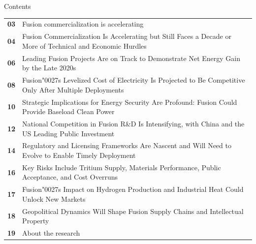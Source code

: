 \documentclass[10pt,a4paper]{article}
\newcommand{\BOApos}{{\BOQuoteFont\char"0027}}
\begin{document}
\clearpage
{\sffamily\fontsize{26}{31}\selectfont\color{BONavy} Contents}\par\vspace{10pt}
\begin{tabularx}{\linewidth}{p{14mm}Y}
\textcolor{BOGreen}{\bfseries 03} & Fusion commercialization is accelerating \\[5pt]
\textcolor{BOGreen}{\bfseries 04} & Fusion Commercialization Is Accelerating but Still Faces a Decade or More of Technical and Economic Hurdles \\[5pt]
\textcolor{BOGreen}{\bfseries 06} & Leading Fusion Projects Are on Track to Demonstrate Net Energy Gain by the Late 2020s \\[5pt]
\textcolor{BOGreen}{\bfseries 08} & Fusion\BOApos{}s Levelized Cost of Electricity Is Projected to Be Competitive Only After Multiple Deployments \\[5pt]
\textcolor{BOGreen}{\bfseries 10} & Strategic Implications for Energy Security Are Profound: Fusion Could Provide Baseload Clean Power \\[5pt]
\textcolor{BOGreen}{\bfseries 12} & National Competition in Fusion R\&D Is Intensifying, with China and the US Leading Public Investment \\[5pt]
\textcolor{BOGreen}{\bfseries 14} & Regulatory and Licensing Frameworks Are Nascent and Will Need to Evolve to Enable Timely Deployment \\[5pt]
\textcolor{BOGreen}{\bfseries 16} & Key Risks Include Tritium Supply, Materials Performance, Public Acceptance, and Cost Overruns \\[5pt]
\textcolor{BOGreen}{\bfseries 17} & Fusion\BOApos{}s Impact on Hydrogen Production and Industrial Heat Could Unlock New Markets \\[5pt]
\textcolor{BOGreen}{\bfseries 18} & Geopolitical Dynamics Will Shape Fusion Supply Chains and Intellectual Property \\[5pt]
\textcolor{BOGreen}{\bfseries 19} & About the research \\[5pt]
\end{tabularx}
\clearpage
\end{document}
